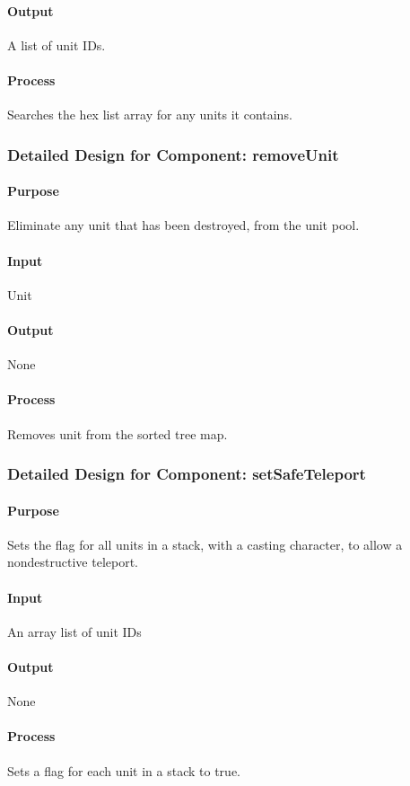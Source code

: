 \documentclass[12pt,a4paper,titlepage]{article}
\begin{document}
\paragraph{Output} A list of unit IDs.
\paragraph{Process} Searches the hex list array for any units it contains.

\subsubsection{Detailed Design for Component: removeUnit}
\paragraph{Purpose} Eliminate any unit that has been destroyed, from the unit pool.
\paragraph{Input} Unit
\paragraph{Output} None
\paragraph{Process} Removes unit from the sorted tree map.

\subsubsection{Detailed Design for Component: setSafeTeleport}
\paragraph{Purpose} Sets the flag for all units in a stack, with a casting character, to allow a nondestructive teleport.
\paragraph{Input} An array list of unit IDs
\paragraph{Output} None
\paragraph{Process} Sets a flag for each unit in a stack to true.
\end{document}
